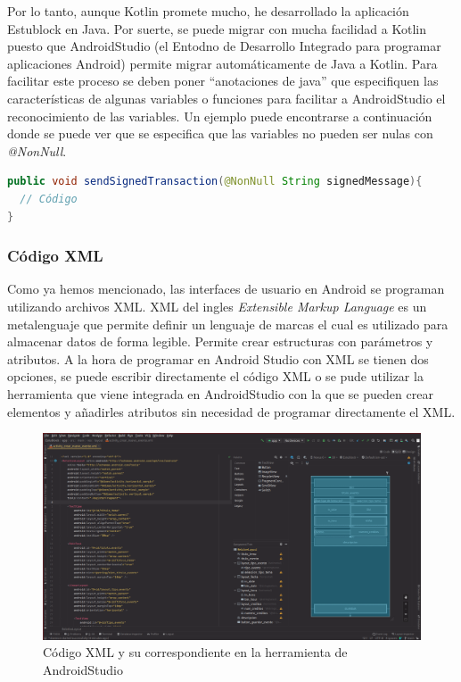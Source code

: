 Por lo tanto, aunque Kotlin promete mucho, he desarrollado la aplicación Estublock en Java. Por suerte, se puede migrar con mucha facilidad a Kotlin puesto que AndroidStudio (el Entodno de Desarrollo Integrado para programar aplicaciones Android) permite migrar automáticamente de Java a Kotlin. Para facilitar este proceso se deben poner ``anotaciones de java'' que especifiquen las características de algunas variables o funciones para facilitar a AndroidStudio el reconocimiento de las variables. Un ejemplo puede encontrarse a continuación donde se puede ver que se especifica que las variables no pueden ser nulas con \emph{@NonNull}.

\begin{lstlisting}[language=Java,float=ht,caption={[Java] Ejemplo de ``anotación de java'' de variables para facilitar el salto a Kotlin},label=lst:java_etiquetas]
public void sendSignedTransaction(@NonNull String signedMessage){
  // Código
}
\end{lstlisting}

\subsubsection{Código XML}

Como ya hemos mencionado, las interfaces de usuario en Android se programan utilizando archivos XML. XML del ingles \emph{Extensible Markup Language} es un metalenguaje que permite definir un lenguaje de marcas el cual es utilizado para almacenar datos de forma legible. Permite crear estructuras con parámetros y atributos. A la hora de programar en Android Studio con XML se tienen dos opciones, se puede escribir directamente el código XML o se pude utilizar la herramienta que viene integrada en AndroidStudio con la que se pueden crear elementos y añadirles atributos sin necesidad de programar directamente el XML. 

\begin{figure}[h!]
  \centering
  \includegraphics[width=0.95\linewidth]{figs/Desarrollo/xml_vs_ezpz}
  \caption[XML]{Código XML y su correspondiente en la herramienta de AndroidStudio}
  \label{fig:xml_vs_ezpz}
\end{figure}

